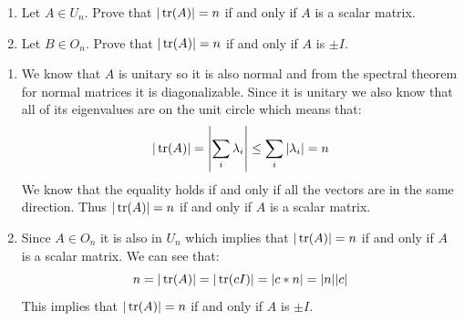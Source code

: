 \documentclass[11pt, a4paper]{article}
\begin{document}
\begin{exercise} \phantom{}
\begin{enumerate}
  \item[(1)] Let $A\in U_n$.
    Prove that $|\operatorname{tr}(A)| = n$ if and only if $A$ is a scalar matrix.
  \item[(2)] Let $B\in O_n$.
    Prove that $|\operatorname{tr}(A)| = n$ if and only if $A$ is $\pm I$.
\end{enumerate}
\end{exercise}
\begin{solution} \phantom{}
\begin{enumerate}
  \item[(1)] We know that $A$ is unitary so it is also normal and from the spectral
theorem for normal matrices it is diagonalizable. Since it is unitary
we also know that all of its eigenvalues are on the unit circle which means
that:
\[
  |\operatorname{tr}(A)| = \left|\sum_i{\lambda_i}\right| \le \sum_i{|\lambda_i|}
  = n
\]
We know that the equality holds if and only if all the vectors are
in the same direction. Thus $|\operatorname{tr}(A)| = n$ if and only if $A$ is a
scalar matrix.
  \item[(2)]
    Since $A\in O_n$ it is also in $U_n$ which implies that $|\operatorname{tr}(A)| = n$ 
    if and only if $A$ is a scalar matrix. We can see that:
    \[
      n = |\operatorname{tr}(A)| = |\operatorname{tr}(cI)| = |c*n| = |n||c|
    \]
    This implies that $|\operatorname{tr}(A)| = n$ if and only if $A$ is $\pm I$.
\end{enumerate}
\end{solution}
\end{document}
